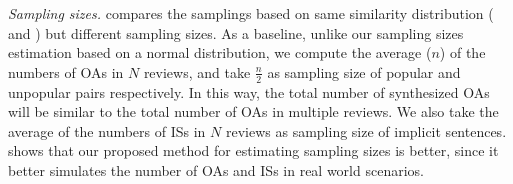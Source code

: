 {\em Sampling sizes.}  compares the samplings based on same similarity 
distribution ( and ) but different sampling sizes. 
As a baseline, unlike our sampling sizes estimation based on a normal distribution, 
we compute the average ($n$) of the numbers of OAs in $N$ reviews, and take $\frac{n}{2}$ as sampling size of popular and unpopular pairs respectively. In this way, the total number of synthesized OAs will be similar to the total number of OAs in multiple reviews. We also take the average of the numbers of ISs 
in $N$ reviews as sampling size of implicit sentences.  
 shows that our proposed method for estimating sampling sizes is better, 
since it better simulates the number of OAs and ISs in real world scenarios. 


